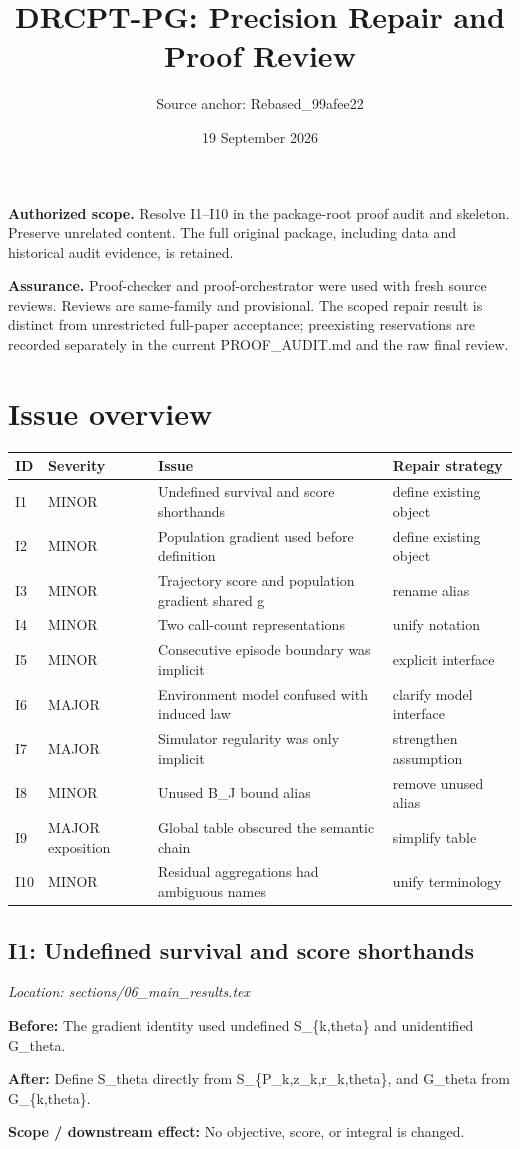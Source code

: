 \documentclass[10pt]{article}
\title{DRCPT-PG: Precision Repair and Proof Review}
\author{Source anchor: Rebased\_99afee22}
\date{19 September 2026}
\newcommand{\before}[1]{\par\noindent\textcolor{before}{\textbf{Before:}} #1\par}
\newcommand{\after}[1]{\par\noindent\textcolor{after}{\textbf{After:}} #1\par}
\newcommand{\scope}[1]{\par\noindent\textcolor{scope}{\textbf{Scope / downstream effect:}} #1\par}
\begin{document}
\maketitle
\noindent\textbf{Authorized scope.} Resolve I1--I10 in the package-root proof audit and skeleton. Preserve unrelated content. The full original package, including data and historical audit evidence, is retained.
\par\medskip
\noindent\textbf{Assurance.} Proof-checker and proof-orchestrator were used with fresh source reviews. Reviews are same-family and provisional. The scoped repair result is distinct from unrestricted full-paper acceptance; preexisting reservations are recorded separately in the current PROOF\_AUDIT.md and the raw final review.
\section*{Issue overview}
\small
\begin{longtable}{@{}p{}p{}p{}p{}@{}}
\toprule ID & Severity & Issue & Repair strategy\\\midrule\endhead
I1 & MINOR & Undefined survival and score shorthands & define existing object \\
I2 & MINOR & Population gradient used before definition & define existing object \\
I3 & MINOR & Trajectory score and population gradient shared g & rename alias \\
I4 & MINOR & Two call-count representations & unify notation \\
I5 & MINOR & Consecutive episode boundary was implicit & explicit interface \\
I6 & MAJOR & Environment model confused with induced law & clarify model interface \\
I7 & MAJOR & Simulator regularity was only implicit & strengthen assumption \\
I8 & MINOR & Unused B\_J bound alias & remove unused alias \\
I9 & MAJOR exposition & Global table obscured the semantic chain & simplify table \\
I10 & MINOR & Residual aggregations had ambiguous names & unify terminology \\
\bottomrule\end{longtable}\normalsize
\subsection*{I1: Undefined survival and score shorthands}
\noindent\textit{Location: sections/06\_main\_results.tex}
\before{The gradient identity used undefined S\_\{k,theta\} and unidentified G\_theta.}
\after{Define S\_theta directly from S\_\{P\_k,z\_k,r\_k,theta\}, and G\_theta from G\_\{k,theta\}.}
\scope{No objective, score, or integral is changed.}
\end{document}
